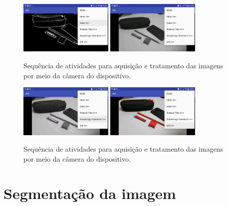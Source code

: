 \begin{figure}[!htb]
 \centering
 \def\baselinestretch{1}\small\normalsize
 \includegraphics[width=0.4\textwidth]{img/camera_app_n4.png}\qquad
 \includegraphics[width=0.4\textwidth]{img/camera_app_n5.png} 
 \caption{\label{fig:camera_app_p3}Sequência de atividades para aquisição e tratamento das imagens por meio da câmera do dispositivo.}
\end{figure}
\begin{figure}[!htb]
 \centering
 \def\baselinestretch{1}\small\normalsize
 \includegraphics[width=0.4\textwidth]{img/camera_app_n6.png}\qquad
 \includegraphics[width=0.4\textwidth]{img/camera_app_n7.png} 
 \caption{\label{fig:camera_app_p4}Sequência de atividades para aquisição e tratamento das imagens por meio da câmera do dispositivo.}
\end{figure}
\clearpage

\section{Segmentação da imagem}\label{sec:segmentacao_aplicacao}


